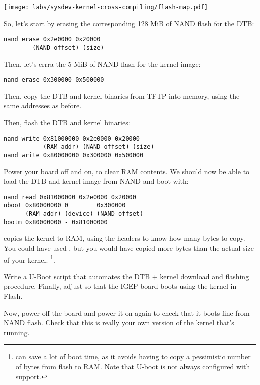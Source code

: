 \begin{center}
  \texttt{[image: labs/sysdev-kernel-cross-compiling/flash-map.pdf]}
\end{center}

So, let's start by erasing the corresponding 128 MiB of NAND flash
for the DTB:

\begin{verbatim}
nand erase 0x2e0000 0x20000
        (NAND offset) (size)
\end{verbatim}

Then, let's errra the 5 MiB of NAND flash for the kernel image:

\begin{verbatim}
nand erase 0x300000 0x500000
\end{verbatim}

Then, copy the DTB and kernel binaries from TFTP into memory, using the
same addresses as before.

Then, flash the DTB and kernel binaries:

\begin{verbatim}
nand write 0x81000000 0x2e0000 0x20000
           (RAM addr) (NAND offset) (size)
nand write 0x80000000 0x300000 0x500000
\end{verbatim}

Power your board off and on, to clear RAM contents. We should now be
able to load the DTB and kernel image from NAND and boot with:

\begin{verbatim}
nand read 0x81000000 0x2e0000 0x20000
nboot 0x80000000 0        0x300000
      (RAM addr) (device) (NAND offset)
bootm 0x80000000 - 0x81000000
\end{verbatim}

 copies the kernel to RAM, using the  headers
to know how many bytes to copy. You could have used , but you would have copied more bytes than
the actual size of your kernel. \footnote{ can save a lot 
of boot time, as it avoids having to copy a pessimistic number of
bytes from flash to RAM. Note that U-boot is not always configured
with  support.}.

Write a U-Boot script that automates the DTB + kernel download
and flashing procedure. Finally, adjust  so that
the IGEP board boots using the kernel in Flash.

Now, power off the board and power it on again to check that it boots
fine from NAND flash. Check that this is really your own version of
the kernel that's running.
